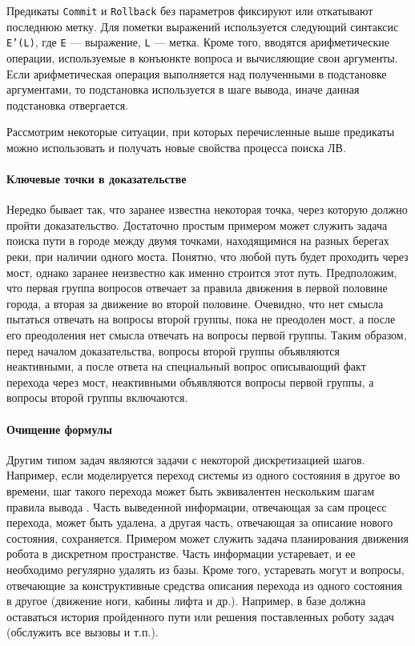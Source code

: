 Предикаты \texttt{Commit} и \texttt{Rollback} без параметров фиксируют или откатывают последнюю метку. Для пометки выражений используется следующий синтаксис \texttt{E'(L)}, где \texttt{E} --– выражение, \texttt{L} --– метка. Кроме того, вводятся арифметические операции, используемые в конъюнкте вопроса и вычисляющие свои аргументы. Если арифметическая операция выполняется над полученными в подстановке аргументами, то подстановка используется в шаге вывода, иначе данная подстановка отвергается.

Рассмотрим некоторые ситуации, при которых перечисленные выше предикаты можно использовать и получать новые свойства процесса поиска ЛВ.

\paragraph{Ключевые точки в доказательстве} Нередко бывает так, что заранее известна некоторая точка, через которую должно пройти доказательство. Достаточно простым примером может служить задача поиска пути в городе между двумя точками, находящимися на разных берегах реки, при наличии одного моста. Понятно, что любой путь будет проходить через мост, однако заранее неизвестно как именно строится этот путь. Предположим, что первая группа вопросов отвечает за правила движения в первой половине города, а вторая за движение во второй половине. Очевидно, что нет смысла пытаться отвечать на вопросы второй группы, пока не преодолен мост, а после его преодоления нет смысла отвечать на вопросы первой группы. Таким образом, перед началом доказательства, вопросы второй группы объявляются неактивными, а после ответа на специальный вопрос описывающий факт перехода через мост, неактивными объявляются вопросы первой группы, а вопросы второй группы включаются.

\paragraph{Очищение формулы} Другим типом задач являются задачи с некоторой дискретизацией шагов. Например, если моделируется переход системы из одного состояния в другое во времени, шаг такого перехода может быть эквивалентен нескольким шагам правила вывода . Часть выведенной информации, отвечающая за сам процесс перехода, может быть удалена, а другая часть, отвечающая за описание нового состояния, сохраняется. Примером может служить задача планирования движения робота в дискретном пространстве. Часть информации устаревает, и ее необходимо регулярно удалять из базы. Кроме того, устаревать могут и вопросы, отвечающие за конструктивные средства описания перехода из одного состояния в другое (движение ноги, кабины лифта и др.). Например, в базе должна оставаться история пройденного пути или решения поставленных роботу задач (обслужить все вызовы и т.п.).

